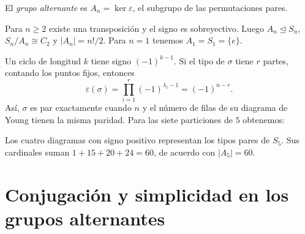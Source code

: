 \begin{defi}
El \emph{grupo alternante} es $A_n=\ker\varepsilon$, el subgrupo de las permutaciones pares.
\end{defi}
Para $n\ge2$ existe una transposición y el signo es sobreyectivo. Luego $A_n\trianglelefteq S_n$, $S_n/A_n\cong C_2$ y $|A_n|=n!/2$. Para $n=1$ tenemos $A_1=S_1=\{e\}$.

Un ciclo de longitud $k$ tiene signo $(-1)^{k-1}$. Si el tipo de $\sigma$ tiene $r$ partes, contando los puntos fijos, entonces
\[
\varepsilon(\sigma)=\prod_{i=1}^r(-1)^{\lambda_i-1}=(-1)^{n-r}.
\]
Así, $\sigma$ es par exactamente cuando $n$ y el número de filas de su diagrama de Young tienen la misma paridad. Para las siete particiones de $5$ obtenemos:
\begin{center}

\end{center}
Los cuatro diagramas con signo positivo representan los tipos pares de $S_5$. Sus cardinales suman $1+15+20+24=60$, de acuerdo con $|A_5|=60$.

\section{Conjugación y simplicidad en los grupos alternantes}
